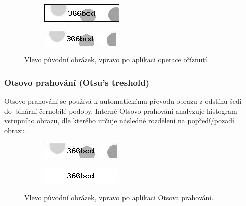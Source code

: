 \documentclass[
  field=ainfp,
  master=true,
  biblatex,
  sourcecodes=false,
  theorems=false,
  glossaries,
  index
]{kidiplom}
\begin{document}
\begin{figure}[H]
\centering
\begin{subfigure}{.5\textwidth}
  \centering
  \includegraphics[width=.8\linewidth]{images/crop_original.png}
\end{subfigure}%
\begin{subfigure}{.5\textwidth}
  \centering
  \includegraphics[width=.8\linewidth]{images/crop_result.png}
\end{subfigure}
\caption{Vlevo původní obrázek, vpravo po aplikaci operace oříznutí.}
\label{fig:crop_example}
\end{figure}

\subsubsection*{Otsovo prahování (Otsu's treshold)}
Otsovo prahování se používá k automatickému převodu obrazu z odstínů šedi do~binární černobílé podoby. Interně Otsovo prahování analyzuje histogram vstup\-ního obrazu, dle kterého určuje následné rozdělení na popředí/pozadí obrazu. 


\begin{figure}[H]
\centering
\begin{subfigure}{.5\textwidth}
  \centering
  \includegraphics[width=.8\linewidth]{images/otsu_original.png}
\end{subfigure}%
\begin{subfigure}{.5\textwidth}
  \centering
  \includegraphics[width=.8\linewidth]{images/otsu_result.png}
\end{subfigure}
\caption{Vlevo původní obrázek, vpravo po aplikaci Otsova prahování.}
\label{fig:inverse_example}
\end{figure}
\end{document}
